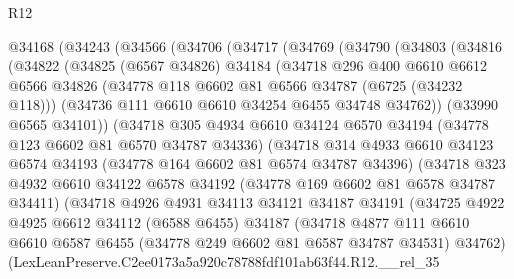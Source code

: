 \begin{lexlean}{R12}
\begin{coremodule}
  @34168
    (@34243
      (@34566
        (@34706
          (@34717
            (@34769
              (@34790
                (@34803
                  (@34816
                    (@34822
                      (@34825
                        (@6567 @34826)
                        @34184
                        (@34718
                          @296
                          @400
                          @6610
                          @6612
                          @6566
                          @34826
                          (@34778 @118 @6602 @81 @6566 @34787 (@6725 (@34232 @118)))
                          (@34736 @111 @6610 @6610 @34254 @6455 @34748 @34762))
                        (@33990 @6565 @34101))
                      (@34718
                        @305
                        @4934
                        @6610
                        @34124
                        @6570
                        @34194
                        (@34778 @123 @6602 @81 @6570 @34787 @34336)
                        (@34718
                          @314
                          @4933
                          @6610
                          @34123
                          @6574
                          @34193
                          (@34778 @164 @6602 @81 @6574 @34787 @34396)
                          (@34718
                            @323
                            @4932
                            @6610
                            @34122
                            @6578
                            @34192
                            (@34778 @169 @6602 @81 @6578 @34787 @34411)
                            (@34718
                              @4926
                              @4931
                              @34113
                              @34121
                              @34187
                              @34191
                              (@34725
                                @4922
                                @4925
                                @6612
                                @34112
                                (@6588 @6455)
                                @34187
                                (@34718
                                  @4877
                                  @111
                                  @6610
                                  @6610
                                  @6587
                                  @6455
                                  (@34778 @249 @6602 @81 @6587 @34787 @34531)
                                  @34762)
                                (LexLeanPreserve.C2ee0173a5a920c78788fdf101ab63f44.R12.__rel_35

\end{coremodule}
\end{lexlean}
